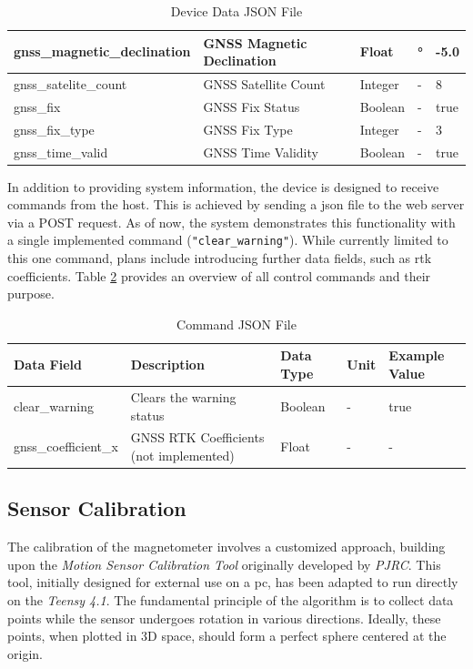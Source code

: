 \begin{table}[h!]
\begin{tabular}{|l|l|l|l|l|}
		gnss\_magnetic\_declination & GNSS Magnetic Declination   & Float              & °             & -5.0                         \\ \hline
		gnss\_satelite\_count       & GNSS Satellite Count        & Integer            & -             & 8                            \\ \hline
		gnss\_fix                   & GNSS Fix Status             & Boolean            & -             & true                         \\ \hline
		gnss\_fix\_type             & GNSS Fix Type               & Integer            & -             & 3                            \\ \hline
		gnss\_time\_valid           & GNSS Time Validity          & Boolean            & -             & true                         \\ \hline
	\end{tabular}
	\caption{Device Data JSON File}
	\label{table:device_data_types}
\end{table}
In addition to providing system information, the device is designed to receive commands from the host.
This is achieved by sending a \acrshort{json} file to the web server via a POST request.
As of now, the system demonstrates this functionality with a single implemented command (\texttt{"clear\_warning"}).
While currently limited to this one command, plans include introducing further data fields, such as \acrshort{rtk} coefficients.
Table \ref{tab:received_commands} provides an overview of all control commands and their purpose.
\begin{table}[h!]
	\centering
	\tiny
	\begin{tabular}{|l|l|l|l|l|}
		\hline
		\textbf{Data Field}  & \textbf{Description}                    & \textbf{Data Type} & \textbf{Unit} & \textbf{Example Value} \\ \hline
		clear\_warning       & Clears the warning status               & Boolean            & -             & true                   \\ \hline
		gnss\_coefficient\_x & GNSS RTK Coefficients (not implemented) & Float              & -             & -                      \\ \hline
	\end{tabular}
	\caption{Command JSON File}
	\label{tab:received_commands}
\end{table}

\newpage
\subsection{Sensor Calibration} \label{sec:sensor_calibration}
The calibration of the magnetometer involves a customized approach, building upon the \textit{Motion Sensor Calibration Tool} originally developed by \textit{PJRC}.
This tool, initially designed for external use on a \acrshort{pc}, has been adapted to run directly on the \textit{Teensy 4.1}.
The fundamental principle of the algorithm is to collect data points while the sensor undergoes rotation in various directions.
Ideally, these points, when plotted in 3D space, should form a perfect sphere centered at the origin.


